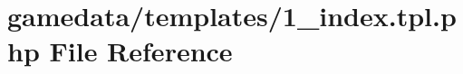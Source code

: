 \hypertarget{1__index_8tpl_8php}{\section{gamedata/templates/1\+\_\+index.tpl.\+php File Reference}
\label{1__index_8tpl_8php}
}
